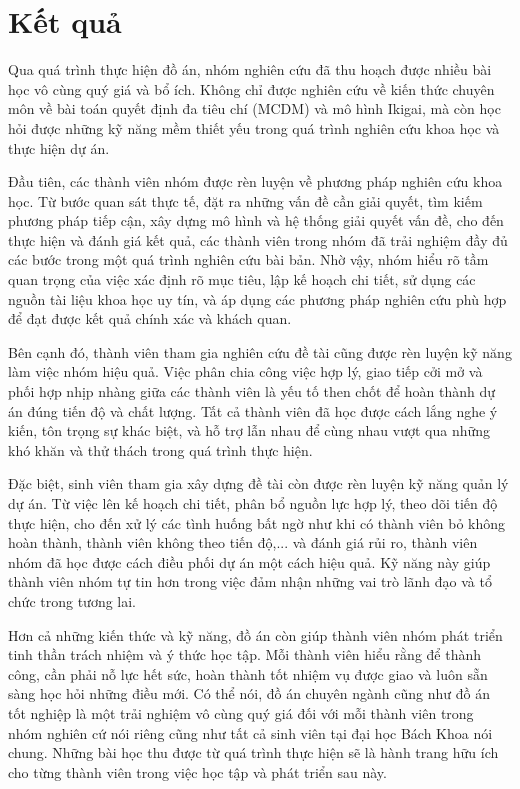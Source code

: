 \section{Kết quả}
    Qua quá trình thực hiện đồ án, nhóm nghiên cứu đã thu hoạch được nhiều bài học vô cùng quý giá và bổ ích. Không chỉ được nghiên cứu về kiến thức chuyên môn về bài toán quyết định đa tiêu chí (MCDM) và mô hình Ikigai, mà còn học hỏi được những kỹ năng mềm thiết yếu trong quá trình nghiên cứu khoa học và thực hiện dự án.
    
    Đầu tiên, các thành viên nhóm được rèn luyện về phương pháp nghiên cứu khoa học. Từ bước quan sát thực tế, đặt ra những vấn đề cần giải quyết, tìm kiếm phương pháp tiếp cận, xây dựng mô hình và hệ thống giải quyết vấn đề, cho đến thực hiện và đánh giá kết quả, các thành viên trong nhóm đã trải nghiệm đầy đủ các bước trong một quá trình nghiên cứu bài bản. Nhờ vậy, nhóm hiểu rõ tầm quan trọng của việc xác định rõ mục tiêu, lập kế hoạch chi tiết, sử dụng các nguồn tài liệu khoa học uy tín, và áp dụng các phương pháp nghiên cứu phù hợp để đạt được kết quả chính xác và khách quan.
    
    Bên cạnh đó, thành viên tham gia nghiên cứu đề tài cũng được rèn luyện kỹ năng làm việc nhóm hiệu quả. Việc phân chia công việc hợp lý, giao tiếp cởi mở và phối hợp nhịp nhàng giữa các thành viên là yếu tố then chốt để hoàn thành dự án đúng tiến độ và chất lượng. Tất cả thành viên đã học được cách lắng nghe ý kiến, tôn trọng sự khác biệt, và hỗ trợ lẫn nhau để cùng nhau vượt qua những khó khăn và thử thách trong quá trình thực hiện.
    
    Đặc biệt, sinh viên tham gia xây dựng đề tài còn được rèn luyện kỹ năng quản lý dự án. Từ việc lên kế hoạch chi tiết, phân bổ nguồn lực hợp lý, theo dõi tiến độ thực hiện, cho đến xử lý các tình huống bất ngờ như khi có thành viên bỏ không hoàn thành, thành viên không theo tiến độ,... và đánh giá rủi ro, thành viên nhóm đã học được cách điều phối dự án một cách hiệu quả. Kỹ năng này giúp thành viên nhóm tự tin hơn trong việc đảm nhận những vai trò lãnh đạo và tổ chức trong tương lai.
    
    Hơn cả những kiến thức và kỹ năng, đồ án còn giúp thành viên nhóm phát triển tinh thần trách nhiệm và ý thức học tập. Mỗi thành viên hiểu rằng để thành công, cần phải nỗ lực hết sức, hoàn thành tốt nhiệm vụ được giao và luôn sẵn sàng học hỏi những điều mới.
    Có thể nói, đồ án chuyên ngành cũng như đồ án tốt nghiệp là một trải nghiệm vô cùng quý giá đối với mỗi thành viên trong nhóm nghiên cứ nói riêng cũng như tất cả sinh viên tại đại học Bách Khoa nói chung. Những bài học thu được từ quá trình thực hiện sẽ là hành trang hữu ích cho từng thành viên trong việc học tập và phát triển sau này.
    
